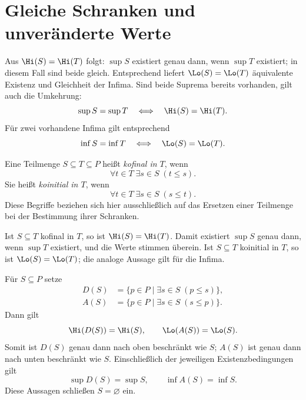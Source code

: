 \section{Gleiche Schranken und unveränderte Werte}

\begin{theorem}
\label{b13guide:thm:same-bounds}
Aus $\Hi(S)=\Hi(T)$ folgt: $\sup S$ existiert genau dann, wenn
$\sup T$ existiert; in diesem Fall sind beide gleich.
Entsprechend liefert $\Lo(S)=\Lo(T)$ äquivalente Existenz und
Gleichheit der Infima.
Sind beide Suprema bereits vorhanden, gilt auch die Umkehrung:
\[
 \sup S=\sup T\quad\Longleftrightarrow\quad\Hi(S)=\Hi(T).
\]
Für zwei vorhandene Infima gilt entsprechend
\[
 \inf S=\inf T\quad\Longleftrightarrow\quad\Lo(S)=\Lo(T).
\]
\end{theorem}

\begin{definition}
\label{b13guide:def:cofinal}
Eine Teilmenge $S\subseteq T\subseteq P$ heißt \emph{kofinal in $T$},
wenn
\[
 \forall t\in T\;\exists s\in S\;(t\leq s).
\]
Sie heißt \emph{koinitial in $T$}, wenn
\[
 \forall t\in T\;\exists s\in S\;(s\leq t).
\]
Diese Begriffe beziehen sich hier ausschließlich auf das Ersetzen
einer Teilmenge bei der Bestimmung ihrer Schranken.
\end{definition}

\begin{theorem}
\label{b13guide:thm:cofinal}
Ist $S\subseteq T$ kofinal in $T$, so ist $\Hi(S)=\Hi(T)$.
Damit existiert $\sup S$ genau dann, wenn $\sup T$ existiert,
und die Werte stimmen überein.
Ist $S\subseteq T$ koinitial in $T$, so ist $\Lo(S)=\Lo(T)$;
die analoge Aussage gilt für die Infima.
\end{theorem}


\begin{theorem}
\label{b13guide:thm:one-sided-enlargement}
Für $S\subseteq P$ setze
\[
\begin{aligned}
 D(S)&=\{p\in P\mid\exists s\in S\;(p\leq s)\},\\
 A(S)&=\{p\in P\mid\exists s\in S\;(s\leq p)\}.
\end{aligned}
\]
Dann gilt
\[
 \Hi(D(S))=\Hi(S),\qquad \Lo(A(S))=\Lo(S).
\]
Somit ist $D(S)$ genau dann nach oben beschränkt wie $S$;
$A(S)$ ist genau dann nach unten beschränkt wie $S$.
Einschließlich der jeweiligen Existenzbedingungen gilt
\[
 \sup D(S)=\sup S,\qquad \inf A(S)=\inf S.
\]
Diese Aussagen schließen $S=\varnothing$ ein.
\end{theorem}

